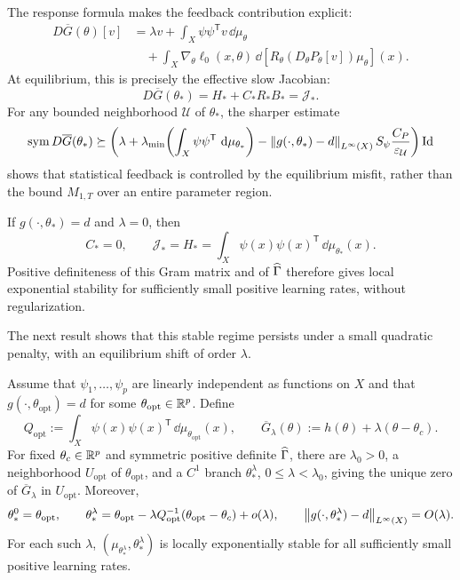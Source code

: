 The response formula makes the feedback contribution explicit:
\begin{equation}
\begin{aligned}
  D\overline G(\theta)[v]
  &=\lambda v+\int_X\psi\psi^{\mathsf T}v\,\dd\mu_\theta\\
  &\quad+\int_X\nabla_\theta\ell_0(x,\theta)\,
    \dd\!\left[R_\theta(D_\theta P_\theta[v])\mu_\theta\right](x).
\end{aligned}
  \label{eq:duffing-explicit-reduced-jacobian}
\end{equation}
At equilibrium, this is precisely the effective slow Jacobian:
\begin{equation}
  D\overline G(\theta_*)=H_*+C_*R_*B_*=\mathcal J_*.
  \label{eq:duffing-jacobian-identification}
\end{equation}
For any bounded neighborhood $\mathcal U$ of $\theta_*$, the sharper estimate
\[
  \operatorname{sym}D\overline G(\theta_*)\succeq
  \left(\lambda+
    \lambda_{\min}\!\left(\int_X\psi\psi^{\mathsf T}\,\,\mathrm{d}\mu_{\theta_*}\right)
    -\left\lVert g(\cdot,\theta_*)-d\right\rVert_{L^\infty(X)}
      S_\psi\frac{C_P}{\varepsilon_{\mathcal U}}\right)\mathrm{Id}
\]
shows that statistical feedback is controlled by the equilibrium misfit,
rather than the bound $M_{1,T}$ over an entire parameter region.

\begin{remark}[The exactly realizable case ($\lambda=0$)]
\label{rem:duffing-realizable-case}
If $g(\cdot,\theta_*)=d$ and $\lambda=0$, then
\[
  C_*=0,\qquad
  \mathcal J_*=H_*=\int_X\psi(x)\psi(x)^{\mathsf T}\,\dd\mu_{\theta_*}(x).
\]
Positive definiteness of this Gram matrix and of $\widehat{\Gamma}$ therefore
gives local exponential stability for sufficiently small positive learning
rates, without regularization.
\end{remark}

The next result shows that this stable regime persists under a small
quadratic penalty, with an equilibrium shift of order $\lambda$.

\begin{proposition}
\label{prop:duffing-small-regularization}
Assume that $\psi_1,\ldots,\psi_p$ are linearly independent as functions
on $X$ and that $g(\cdot,\theta_{\mathrm{opt}})=d$ for some
$\theta_{\mathrm{opt}}\in\mathbb{R}^p$. Define
\[
  Q_{\mathrm{opt}}:=\int_X\psi(x)\psi(x)^{\mathsf T}
    \,\dd\mu_{\theta_{\mathrm{opt}}}(x),
  \qquad \overline G_\lambda(\theta):=h(\theta)+\lambda(\theta-\theta_c).
\]
For fixed $\theta_c\in\mathbb{R}^p$ and symmetric positive definite $\widehat{\Gamma}$,
there are $\lambda_0>0$, a neighborhood $U_{\mathrm{opt}}$ of
$\theta_{\mathrm{opt}}$, and a $C^1$ branch $\theta_*^\lambda$,
$0\le\lambda<\lambda_0$, giving the unique zero of $\overline G_\lambda$
in $U_{\mathrm{opt}}$. Moreover,
\[
  \theta_*^0=\theta_{\mathrm{opt}},\qquad
  \theta_*^\lambda=\theta_{\mathrm{opt}}
    -\lambda Q_{\mathrm{opt}}^{-1}(\theta_{\mathrm{opt}}-\theta_c)+o(\lambda),
  \qquad
  \left\lVert g(\cdot,\theta_*^\lambda)-d\right\rVert_{L^\infty(X)}=O(\lambda).
\]
For each such $\lambda$, $(\mu_{\theta_*^\lambda},\theta_*^\lambda)$ is
locally exponentially stable for all sufficiently small positive learning rates.
\end{proposition}

